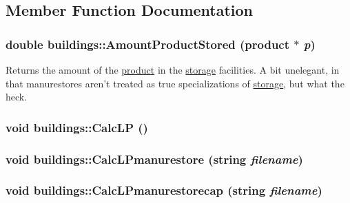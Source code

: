 \subsection{Member Function Documentation}
\hypertarget{classbuildings_a503da8794e3f43e19319e097e9b6e40c}{
\subsubsection[{AmountProductStored}]{\setlength{\rightskip}{0pt plus 5cm}double buildings::AmountProductStored ({\bf product} $\ast$ {\em p})}}
\label{classbuildings_a503da8794e3f43e19319e097e9b6e40c}
Returns the amount of the \hyperlink{classproduct}{product} in the \hyperlink{classstorage}{storage} facilities. A bit unelegant, in that manurestores aren't treated as true specializations of \hyperlink{classstorage}{storage}, but what the heck. \hypertarget{classbuildings_a23440e08dbfc88ebfa39a3e097f6c366}{
\subsubsection[{CalcLP}]{\setlength{\rightskip}{0pt plus 5cm}void buildings::CalcLP ()}}
\label{classbuildings_a23440e08dbfc88ebfa39a3e097f6c366}
\hypertarget{classbuildings_acd04fcf6f4eefce96875603c5d283dd4}{
\subsubsection[{CalcLPmanurestore}]{\setlength{\rightskip}{0pt plus 5cm}void buildings::CalcLPmanurestore (string {\em filename})}}
\label{classbuildings_acd04fcf6f4eefce96875603c5d283dd4}
\hypertarget{classbuildings_ae61dd92b601d41c4b3d41dfc3aa28238}{
\subsubsection[{CalcLPmanurestorecap}]{\setlength{\rightskip}{0pt plus 5cm}void buildings::CalcLPmanurestorecap (string {\em filename})}}
